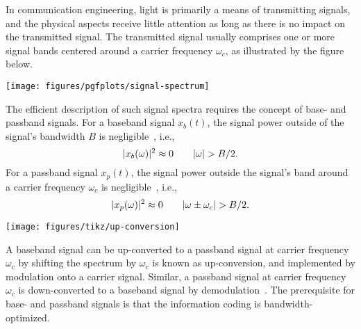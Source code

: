 In communication engineering, light is primarily a means of transmitting signals, and the physical aspects receive little attention as long as there is no impact on the transmitted signal.
The transmitted signal usually comprises one or more signal bands centered around a carrier frequency $\omega_c$, as illustrated by the figure below.
\begin{figure*}[htb]
	\centering
	\texttt{[image: figures/pgfplots/signal-spectrum]}
	\caption*{Receiver spectrum comprising multiple signal bands relative to a carrier frequency at $\omega=0$. At \SI{+100}{\mega\hertz}, the spectrum has a pilot tone broadened by phase noise. Centered at \SI{-25}{\mega\hertz}, the spectrum contains a first signal band with \SI{12.5}{\mega\hertz} bandwidth. Centered at \SI{-168.75}{\mega\hertz}, the spectrum contains a second signal band with \SI{12.5}{\mega\hertz} bandwidth. The remaining segments of the spectrum include mirror bands or disturbances.}
\end{figure*}
The efficient description of such signal spectra requires the concept of base- and passband signals.
For a baseband signal $x_b(t)$, the signal power outside of the signal's bandwidth $B$ is negligible~\cite[p.~15]{Madhow2008}, i.e.,
\begin{equation*}
	\lvert x_b(\omega)\rvert^2
	\approx
	0
	\qquad
	\lvert\omega\rvert
	>
	B/2
	.
\end{equation*}
For a passband signal $x_p(t)$, the signal power outside the signal's band around a carrier frequency $\omega_c$ is negligible~\cite[p.~16]{Madhow2008}, i.e.,
\begin{equation*}
	\lvert x_p(\omega)\rvert^2
	\approx
	0
	\qquad
	\lvert\omega\pm\omega_c\rvert
	>
	B/2
	.	
\end{equation*}
\begin{figure*}[htb]
	\centering
	\texttt{[image: figures/tikz/up-conversion]}
	\caption*{Power spectrum illustrating up-conversion of a real-valued passband signal with bandwidth $B$ centered at $\omega_0$. Up-conversion by $\omega_c$ shifts the passband to $\omega_c+\omega_0$ and creates a mirror band at $\omega_c-\omega_0$.}
\end{figure*}
A baseband signal can be up-converted to a passband signal at carrier frequency $\omega_c$ by shifting the spectrum by $\omega_c$ is known as up-conversion, and implemented by modulation onto a carrier signal.
Similar, a passband signal at carrier frequency $\omega_c$ is down-converted to a baseband signal by demodulation~\cite[p.~26]{Madhow2008}.
The prerequisite for base- and passband signals is that the information coding is bandwidth-optimized.

